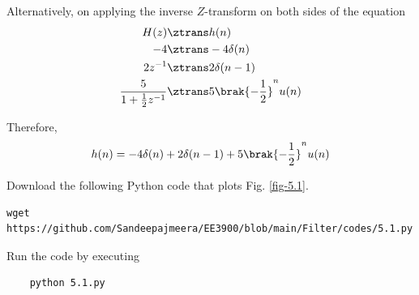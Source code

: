 \documentclass[journal,12pt,twocolumn]{IEEEtran}
\renewcommand\thesection{\arabic{section}}
\begin{document}
\begin{enumerate}[label=\thesection.\arabic*
,ref=\thesection.\theenumi]
Alternatively, on applying the inverse $Z$-transform on both sides of the equation
\begin{align}
	H(z) &\ztrans h(n) \\
	-4 &\ztrans -4\delta(n) \\
	2z^{-1} &\ztrans 2\delta(n - 1) \\
	\frac{5}{1 + \frac12 z^{-1}} &\ztrans 5\brak{-\frac12}^n u(n) \\
\end{align}

Therefore,
\begin{equation}
	h(n) = -4\delta(n) + 2\delta(n - 1) + 5\brak{-\frac12}^n u(n)
\end{equation}

Download the following Python code that plots Fig. \ref{fig-5.1}.
\begin{lstlisting}
wget https://github.com/Sandeepajmeera/EE3900/blob/main/Filter/codes/5.1.py
\end{lstlisting}

Run the code by executing
\begin{lstlisting}
	python 5.1.py
\end{lstlisting}


\end{enumerate}
\end{document}
